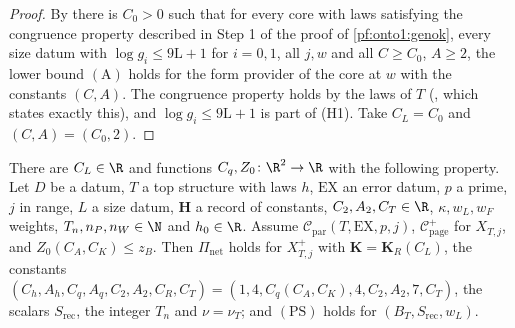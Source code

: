 \begin{proof}
By  there is $C_0>0$ such that for every core with
laws satisfying the congruence property described in Step 1 of the proof of \cref{pf:onto1:genok}, every size datum with
$\log g_i\le9\mathrm L+1$ for $i=0,1$, all $j,w$ and all $C\ge C_0$, $A\ge2$, the lower bound $(\mathrm A)$ holds for the form
provider of the core at $w$ with the constants $(C,A)$. The congruence property holds by the laws of $T$
(, which states exactly this), and $\log g_i\le9\mathrm L+1$ is part of
(H1). Take $C_L=C_0$ and $(C,A)=(C_0,2)$.
\end{proof}

\begin{theorem}\label{pf:onto1:inputsNet}
There are $C_L\in\R$ and functions $C_q,Z_0\colon\R^2\to\R$ with the following property. Let $D$ be a datum, $T$ a top
structure with laws $h$, $\mathrm{EX}$ an error datum, $p$ a prime, $j$ in range, $L$ a size datum, $\mathbf H$ a record of
constants, $C_2,A_2,C_T\in\R$, $\kappa,w_L,w_F$ weights, $T_n,n_P,n_W\in\N$ and $h_0\in\R$. Assume
$\mathcal C_{\mathrm{par}}(T,\mathrm{EX},p,j)$, $\mathcal C^+_{\mathrm{page}}$ for $X_{T,j}$, and $Z_0(C_A,C_K)\le z_B$. Then
$\Pi_{\mathrm{net}}$ holds for $X^+_{T,j}$ with $\mathbf K=\mathbf K_R(C_L)$, the constants
$(C_h,A_h,C_q,A_q,C_2,A_2,C_R,C_T)=(1,4,C_q(C_A,C_K),4,C_2,A_2,7,C_T)$, the scalars $S_{\mathrm{rec}}$, the integer $T_n$
and $\nu=\nu_T$; and $(\mathrm{PS})$ holds for $(B_T,S_{\mathrm{rec}},w_L)$.
\end{theorem}

